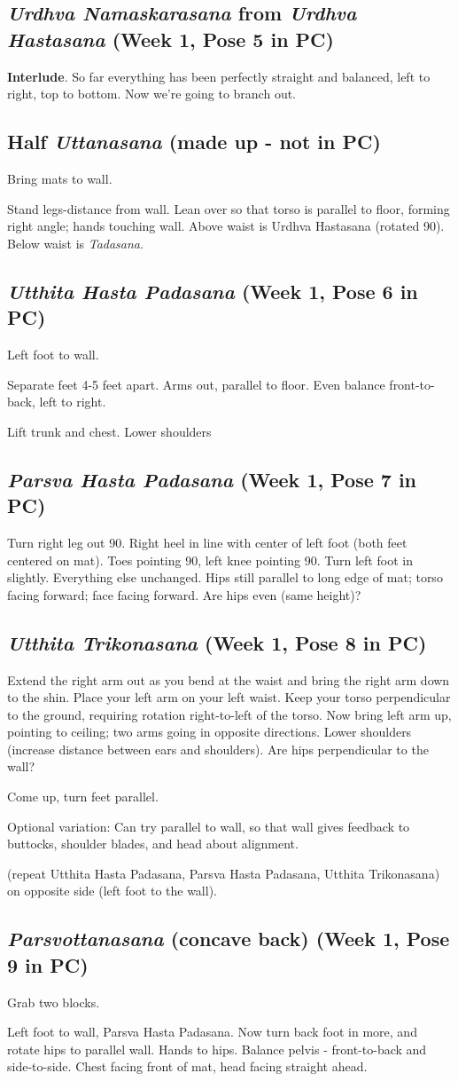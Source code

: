 \documentclass{book}
\newcommand{\apose}[1]{\emph{#1}}
\newcommand{\parshastpad}{\apose{Parsva Hasta Padasana}}
\newcommand{\parsvo}{\apose{Parsvottanasana}}
\newcommand{\tad}{\apose{Tadasana}}
\newcommand{\urdhast}{\apose{Urdhva Hastasana}}
\newcommand{\urdnam}{\apose{Urdhva Namaskarasana}}
\newcommand{\utt}{\apose{Uttanasana}}
\newcommand{\utthastpad}{\apose{Utthita Hasta Padasana}}
\newcommand{\utttrik}{\apose{Utthita Trikonasana}}
\newcommand{\PC}[2]{{\normalfont\normalsize \hfill(Week #1, Pose #2 in PC)}}
\newcommand{\newpose}[1]{{{#1}}}
\newcounter{pose}
\newcommand{\pose}{\subsection}
\begin{document}
\pose{\newpose{\urdnam{}} from \urdhast{} \PC{1}{5}}


\textbf{Interlude}. So far everything has been perfectly straight and
balanced, left to right, top to bottom. Now we're going to branch out.

\pose{\newpose{Half \utt} (made up - not in PC)}


Bring mats to wall.

Stand legs-distance from wall. Lean over so that torso is parallel to
floor, forming right angle; hands touching wall. Above waist is Urdhva
Hastasana (rotated 90\textdegree). Below waist is \tad.


\pose{\newpose{\utthastpad} \PC{1}{6}}

Left foot to wall.

Separate feet 4-5 feet apart. Arms out, parallel to floor. Even
balance front-to-back, left to right.

Lift trunk and chest. Lower shoulders

\pose{\newpose{\parshastpad} \PC{1}{7}}


Turn right leg out 90\textdegree. Right heel in line with center of
left foot (both feet centered on mat). Toes pointing 90\textdegree,
left knee pointing 90\textdegree. Turn left foot in
slightly. Everything else unchanged. Hips still parallel to long edge
of mat; torso facing forward; face facing forward. Are hips even (same
height)?

\pose{\newpose{\utttrik} \PC{1}{8}}


Extend the right arm out as you bend at the waist and bring the right
arm down to the shin. Place your left arm on your left waist. Keep
your torso perpendicular to the ground, requiring rotation
right-to-left of the torso. Now bring left arm up, pointing to
ceiling; two arms going in opposite directions. Lower shoulders
(increase distance between ears and shoulders). Are hips perpendicular
to the wall?

Come up, turn feet parallel.

Optional variation: Can try parallel to wall, so that wall gives
feedback to buttocks, shoulder blades, and head about alignment.

(repeat Utthita Hasta Padasana, Parsva Hasta Padasana, Utthita
Trikonasana) on opposite side (left foot to the wall).

\pose{\newpose{\parsvo{} (concave back) \PC{1}{9}}}

Grab two blocks.

Left foot to wall, Parsva Hasta Padasana. Now turn back foot in more,
and rotate hips to parallel wall. Hands to hips. Balance pelvis -
front-to-back and side-to-side. Chest facing front of mat, head facing
straight ahead.
\end{document}
